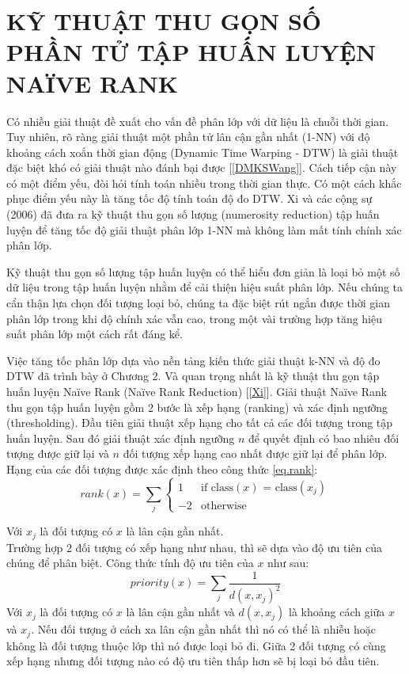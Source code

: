 \documentclass[13pt,oneside]{scrbook}
\begin{document}
\section{KỸ THUẬT THU GỌN SỐ PHẦN TỬ TẬP HUẤN LUYỆN NAÏVE RANK}
Có nhiều giải thuật đề xuất cho vấn đề phân lớp với dữ liệu là chuỗi thời gian. 
Tuy nhiên, rõ ràng giải thuật một phần tử lân cận gần nhất (1-NN) với độ khoảng cách xoắn thời gian động (Dynamic Time Warping - DTW) là giải thuật đặc biệt khó có giải thuật nào đánh bại được [\ref{DMKSWang}]. 
Cách tiếp cận này có một điểm yếu, đòi hỏi tính toán nhiều trong thời gian thực. 
Có một cách khắc phục điểm yếu này là tăng tốc độ tính toán độ đo DTW. 
Xi và các cộng sự (2006) đã đưa ra kỹ thuật thu gọn số lượng (numerosity reduction) tập huấn luyện để tăng tốc độ giải thuật phân lớp 1-NN mà không làm mất tính chính xác phân lớp.

Kỹ thuật thu gọn số lượng tập huấn luyện có thể hiểu đơn giản là loại bỏ một số dữ liệu trong tập huấn luyện nhằm để cải thiện hiệu suất phân lớp. 
Nếu chúng ta cẩn thận lựa chọn đối tượng loại bỏ, chúng ta đặc biệt rút ngắn được thời gian phân lớp trong khi độ chính xác vẫn cao, trong một vài trường hợp tăng hiệu suất phân lớp một cách rất đáng kể.

Việc tăng tốc phân lớp dựa vào nền tảng kiến thức giải thuật k-NN và độ đo DTW đã trình bày ở Chương 2. 
Và quan trọng nhất là kỹ thuật thu gọn tập huấn luyện Naïve Rank (Naïve Rank Reduction) [\ref{Xi}].
Giải thuật Naïve Rank thu gọn tập huấn luyện gồm 2 bước là xếp hạng (ranking) và xác định ngưỡng (thresholding).
Đầu tiên giải thuật xếp hạng cho tất cả các đối tượng trong tập huấn luyện. 
Sau đó giải thuật xác định ngưỡng $n$ để quyết định có bao nhiêu đối tượng được giữ lại và $n$ đối tượng xếp hạng cao nhất được giữ lại để phân lớp.\\
Hạng của các đối tượng được xác định theo công thức \ref{eq.rank}: \\
\begin{equation}\label{eq.rank}
rank(x)=\sum_j
\begin{cases} 
      1 & \text{if class$(x)$ = class$(x_j)$} \\
       -2 & \text{otherwise}
   \end{cases}
\end{equation}

Với $x_j$ là đối tượng có $x$ là lân cận gần nhất.\\
Trường hợp 2 đối tượng có xếp hạng như nhau, thì sẽ dựa vào độ ưu tiên của chúng để phân biệt. Công thức tính độ ưu tiên của $x$ như sau:
\begin{equation}\label{eq.priority}
    priority(x) = \sum\limits_j {\frac{1}{{d{{(x, {x_j})}^2}}}}
\end{equation}
Với $x_j$ là đối tượng có $x$ là lân cận gần nhất và $d(x, x_j)$ là khoảng cách giữa $x$ và $x_j$. 
Nếu đối tượng ở cách xa lân cận gần nhất thì nó có thể là nhiễu hoặc không là đối tượng thuộc lớp thì nó được loại bỏ đi. 
Giữa 2 đối tượng có cùng xếp hạng nhưng đối tượng nào có độ ưu tiên thấp hơn sẽ bị loại bỏ đầu tiên.
\end{document}
